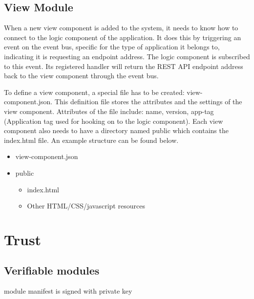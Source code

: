 
\subsection{View Module}
When a new view component is added to the system, it needs to know how to connect to the logic component of the application. It does this by triggering an event on the event bus, specific for the type of application it belongs to, indicating it is requesting an endpoint address. The logic component is subscribed to this event. Its registered handler will return the REST API endpoint address back to the view component through the event bus.

To define a view component, a special file has to be created: view-component.json. This definition file stores the attributes and the settings of the view component. Attributes of the file include: name, version, app-tag (Application tag used for hooking on to the logic component). Each view component also needs to have a directory named public which contains the index.html file. An example structure can be found below.

\begin{itemize}
	\item view-component.json
	\item public \begin{itemize}
		\item index.html
		\item Other HTML/CSS/javascript resources
	\end{itemize}
\end{itemize}

%
%

\section{Trust}

\subsection{Verifiable modules}
module manifest is signed with private key

